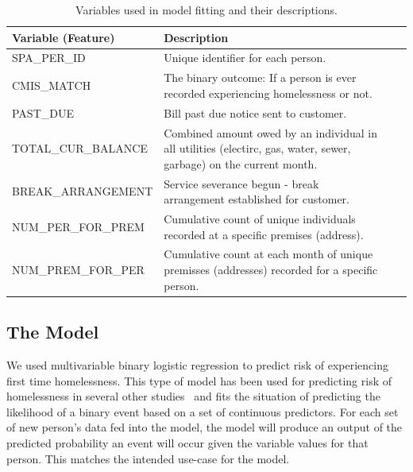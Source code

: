 \documentclass[10pt,letterpaper]{article}
\begin{document}
\begin{table}[htb]
    \centering
    \begin{tabular}{l p{8cm} l p{14cm}}
        \toprule
        Variable (Feature) &                  Description \\
        \midrule \vspace{0.25cm}
        SPA\_PER\_ID & Unique identifier for each person. \\
        \hline \vspace{0.25cm}
        CMIS\_MATCH & The binary outcome: If a person is ever recorded experiencing homelessness or not. \\
        \hline \vspace{0.25cm}
        PAST\_DUE & Bill past due notice sent to customer. \\
        \hline \vspace{0.25cm}
        TOTAL\_CUR\_BALANCE & Combined amount owed by an individual in all utilities (electirc, gas, water, sewer, garbage) on the current month. \\
        \hline \vspace{0.25cm}
        BREAK\_ARRANGEMENT & Service severance begun - break arrangement established for customer. \\
        \hline \vspace{0.25cm}
        NUM\_PER\_FOR\_PREM & Cumulative count of unique individuals recorded at a specific premises (address). \\
        \hline \vspace{0.25cm}
        NUM\_PREM\_FOR\_PER & Cumulative count at each month of unique premisses (addresses) recorded for a specific person. \\
        \midrule
    \end{tabular}
    \caption[Variables Used]{Variables used in model fitting and their descriptions.}
    \label{tbl:varsUsed}
\end{table}

\subsection*{The Model}
We used multivariable binary logistic regression to predict risk of experiencing first time homelessness. This type of model has been used for predicting risk of homelessness in several other studies~\cite{byrne2020classification,van2009longitudinal,flaming2011crisis, hong2018applications,toros2019early} and fits the situation of predicting the likelihood of a binary event based on a set of continuous predictors. For each set of new person's data fed into the model, the model will produce an output of the predicted probability an event will occur given the variable values for that person. This matches the intended use-case for the model. 
\end{document}
